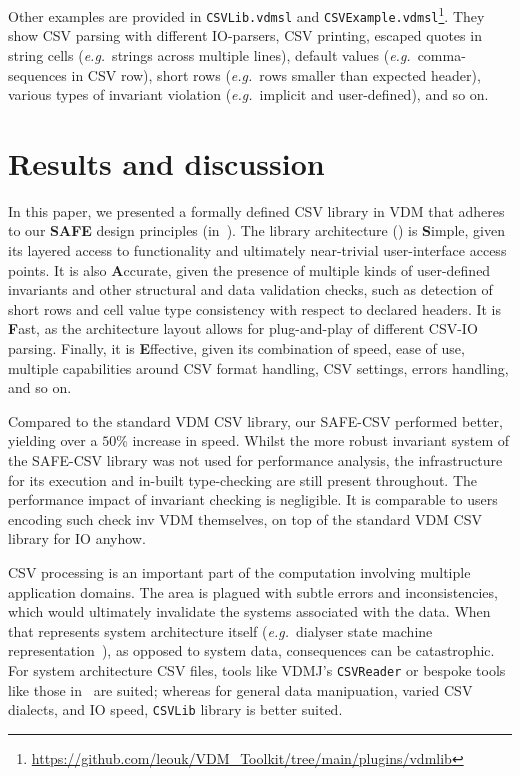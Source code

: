 \documentclass[runningheads,a4paper]{llncs}
\newcommand{\lfcomment}[1]{{\scriptsize\textcolor{red}{LF:~#1}}}  %
\begin{document}
Other examples are provided in \texttt{CSVLib.vdmsl} and \texttt{\scriptsize CSVExample.vdmsl}\footnote{\url{https://github.com/leouk/VDM_Toolkit/tree/main/plugins/vdmlib}}. They show CSV parsing with different IO-parsers, CSV printing, escaped quotes in string cells (\textit{e.g.}~strings across multiple lines), default values (\textit{e.g.}~comma-sequences in CSV row), short rows (\textit{e.g.}~rows smaller than expected header), various types of invariant violation (\textit{e.g.}~implicit and user-defined), and so on. 


\section{Results and discussion}\label{sec:Results}

In this paper, we presented a formally defined CSV library in VDM that adheres to our \textbf{SAFE} design principles (in~). The library architecture () is \textbf{S}imple, given its layered access to functionality and ultimately near-trivial user-interface access points. It is also \textbf{A}ccurate, given the presence of multiple kinds of user-defined invariants and other structural and data validation checks, such as detection of short rows and cell value type consistency with respect to declared headers. It is \textbf{F}ast, as the architecture layout allows for plug-and-play of different CSV-IO parsing. Finally, it is \textbf{E}ffective, given its combination of speed, ease of use, multiple capabilities around CSV format handling, CSV settings, errors handling, and so on.   

Compared to the standard VDM CSV library, our SAFE-CSV performed better, yielding over a \(50\)\% increase in speed. Whilst the more robust invariant system of the SAFE-CSV library was not used for performance analysis, the infrastructure for its execution and in-built type-checking are still present throughout. The performance impact of invariant checking is negligible. It is comparable to users encoding such check inv VDM themselves, on top of the standard VDM CSV library for IO anyhow.  

CSV processing is an important part of the computation involving multiple application domains. The area is plagued with subtle errors and inconsistencies, which would ultimately invalidate the systems associated with the data. When that represents system architecture itself (\textit{e.g.}~dialyser state machine representation~\cite{scp-dialyser}), as opposed to system data, consequences can be catastrophic. For system architecture CSV files, tools like VDMJ's \texttt{CSVReader} or bespoke tools like those in~\cite{egleUG,alastairMSc,emv2} are suited; whereas for general data manipuation, varied CSV dialects, and IO speed, \texttt{CSVLib} library is better suited.
\end{document}
